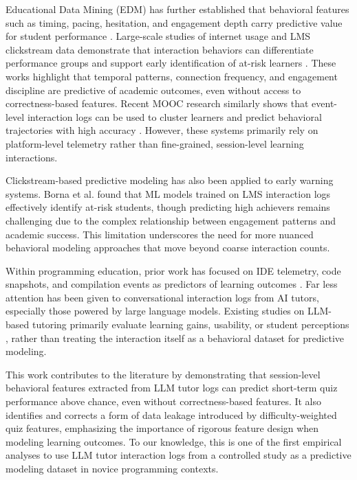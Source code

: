 \documentclass[conference]{IEEEtran}
\begin{document}
Educational Data Mining (EDM) has further established that behavioral
features such as timing, pacing, hesitation, and engagement depth carry
predictive value for student performance \cite{romero2010edm,
baker2009state}. Large-scale studies of internet usage and LMS
clickstream data demonstrate that interaction behaviors can differentiate
performance groups and support early identification of at-risk learners
\cite{xu2019internetusage}. These works highlight that temporal patterns,
connection frequency, and engagement discipline are predictive of
academic outcomes, even without access to correctness-based features.
Recent MOOC research similarly shows that event-level interaction logs
can be used to cluster learners and predict behavioral trajectories with
high accuracy \cite{chonraksuk2024thaiMOOC}. However, these systems
primarily rely on platform-level telemetry rather than fine-grained,
session-level learning interactions.

Clickstream-based predictive modeling has also been applied to early
warning systems. Borna et al. \cite{10.3389/feduc.2024.1421479} found that ML models trained on LMS interaction logs effectively identify at-risk
students, though predicting high achievers remains challenging due to
the complex relationship between engagement patterns and academic
success. This limitation underscores the need for more nuanced
behavioral modeling approaches that move beyond coarse interaction
counts.

Within programming education, prior work has focused on IDE telemetry,
code snapshots, and compilation events as predictors of learning
outcomes \cite{piech2015deep, rivers2017automated}. Far less attention
has been given to conversational interaction logs from AI tutors,
especially those powered by large language models. Existing studies on
LLM-based tutoring primarily evaluate learning gains, usability, or
student perceptions \cite{kasneci2023chatgpt}, rather than treating the
interaction itself as a behavioral dataset for predictive modeling.

This work contributes to the literature by demonstrating that
session-level behavioral features extracted from LLM tutor logs can
predict short-term quiz performance above chance, even without
correctness-based features. It also identifies and corrects a form of
data leakage introduced by difficulty-weighted quiz features, emphasizing
the importance of rigorous feature design when modeling learning
outcomes. To our knowledge, this is one of the first empirical analyses
to use LLM tutor interaction logs from a controlled study as a predictive
modeling dataset in novice programming contexts.
\end{document}
